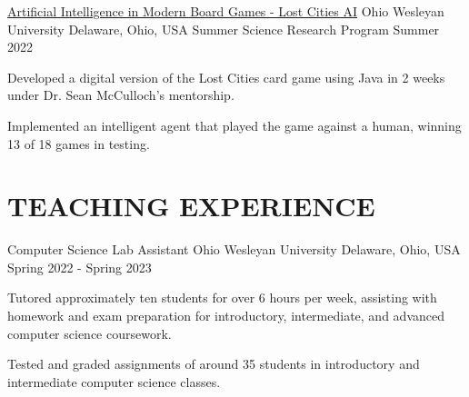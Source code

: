 \documentclass[10pt, letterpaper]{article}
\begin{document}
\begin{researchentry}
    {\href{https://github.com/agopalareddy/LostCities}{Artificial Intelligence in Modern Board Games - Lost Cities AI}} %
    {Ohio Wesleyan University} %
    {Delaware, Ohio, USA} %
    {Summer Science Research Program} %
    {Summer 2022} %
    \item Developed a digital version of the Lost Cities card game using Java in 2 weeks under Dr. Sean McCulloch's mentorship.
    \item Implemented an intelligent agent that played the game against a human, winning 13 of 18 games in testing.
\end{researchentry}

\vspace{\headerSpacing}

\section{TEACHING EXPERIENCE}

\begin{experienceentry}
    {Computer Science Lab Assistant} %
    {Ohio Wesleyan University} %
    {Delaware, Ohio, USA} %
    {Spring 2022 - Spring 2023} %
    \item Tutored approximately ten students for over 6 hours per week, assisting with homework and exam preparation for introductory, intermediate, and advanced computer science coursework.
    \item Tested and graded assignments of around 35 students in introductory and intermediate computer science classes.
\end{experienceentry}

\vspace{\headerSpacing}

\end{document}

